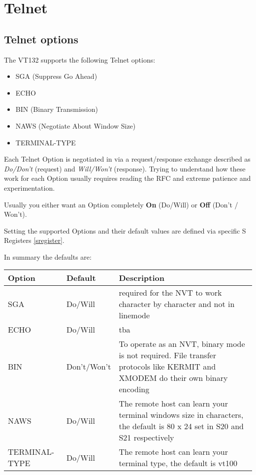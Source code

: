 
\newpage
\section{Telnet}

\subsection{Telnet options}

The VT132 supports the following Telnet options:

\begin{itemize}[leftmargin=1em]
	\item SGA (Suppress Go Ahead)
	\item ECHO
	\item BIN (Binary Transmission)
	\item NAWS (Negotiate About Window Size)
	\item TERMINAL-TYPE
\end{itemize}

Each Telnet Option is negotiated in via a request/response exchange described as \textit{Do/Don't} (request) and \textit{Will/Won't} (response).
Trying to understand how these work for each Option usually requires reading the RFC and extreme patience and experimentation.

Usually you either want an Option completely \textbf{On} (Do/Will) or \textbf{Off} (Don't / Won't).

Setting the supported Options and their default values are defined via specific S Registers \vref{sregister}.

In summary the defaults are:

\begin{tabular}{p{6em} | p{5.5em} | p{}}
\hline
\textbf{Option}	& \textbf{Default}	& \textbf{Description} \\
\hline
SGA				& Do/Will		& required for the NVT to work character by character and not in linemode \\
ECHO			& Do/Will		& tba \\
BIN				& Don't/Won't	& To operate as an NVT, binary mode is not required. File transfer protocols like KERMIT and XMODEM do their own binary encoding \\
NAWS			& Do/Will		& The remote host can learn your terminal windows size in characters, the default is 80 x 24 set in S20 and S21 respectively \\
TERMINAL-TYPE	& Do/Will		& The remote host can learn your terminal type, the default is vt100 \\
\hline
\end{tabular}
\bigskip

